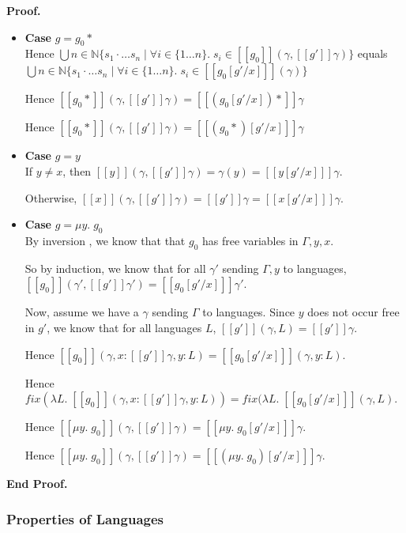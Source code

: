 \documentclass{article}
\newcommand{\fix}[2]{\mu {#1}.\;{#2}}
\newcommand{\nats}{\mathbb{N}}
\newcommand{\interp}[1]{[\![{#1}]\!]}
\newcommand{\setof}[1]{\{{#1}\}}
\newcommand{\comprehend}[2]{\setof{{#1}\;|\;{#2}}}
\newcommand{\fun}[2]{\lambda {#1}.\;{#2}}
\newenvironment{proof}{\noindent\textbf{Proof.}}{\noindent\textbf{End Proof.}}
\newenvironment{caseblock}{\begin{itemize}}{\end{itemize}}
\newenvironment{case}[1]{\item \textbf{Case} {#1}\\}{}
\begin{document}
\begin{proof}
\begin{caseblock}
\begin{case}{$g = g_0*$}
      Hence $\bigcup\limits{n \in \nats} \comprehend{s_1\cdot\ldots s_n}{\forall i \in \setof{1\ldots n}.\; s_i \in \interp{g_0}(\gamma, \interp{g'}\gamma)}$ equals\\
      $\bigcup\limits{n \in \nats} \comprehend{s_1\cdot\ldots s_n}{\forall i \in \setof{1\ldots n}.\; s_i \in \interp{g_0[g'/x]}(\gamma)}$

      Hence $\interp{g_0*}(\gamma, \interp{g'}\gamma) = \interp{(g_0[g'/x])*}\gamma$

      Hence $\interp{g_0*}(\gamma, \interp{g'}\gamma) = \interp{(g_0*)[g'/x]}\gamma$
    \end{case}

    \begin{case}{$g = y$}
      If $y \not=x$, then $\interp{y}(\gamma, \interp{g'}\gamma) = \gamma(y) = \interp{y[g'/x]}\gamma$. 

      Otherwise, $\interp{x}(\gamma, \interp{g'}\gamma) = \interp{g'}\gamma = \interp{x[g'/x]}\gamma$. 
    \end{case}

    \begin{case}{$g = \fix{y}{g_0}$}
      By inversion , we know that that $g_0$ has free variables in $\Gamma, y, x$. 

      So by induction, we know that for all $\gamma'$ sending $\Gamma, y$ to languages, 
      $\interp{g_0}(\gamma', \interp{g'}\gamma') = \interp{g_0[g'/x]}\gamma'$. 

      Now, assume we have a $\gamma$ sending $\Gamma$ to languages. Since $y$ does not 
      occur free in $g'$, we know that for all languages $L$, $\interp{g'}(\gamma, L) = \interp{g'}\gamma$. 

      Hence $\interp{g_0}(\gamma, x:\interp{g'}\gamma, y:L) = \interp{g_0[g'/x]}(\gamma, y:L)$.

      Hence $\mathit{fix}(\fun{L}{\interp{g_0}(\gamma, x:\interp{g'}\gamma, y:L)}) = \mathit{fix}(\fun{L}{\interp{g_0[g'/x]}(\gamma, L)}$. 
 
      Hence $\interp{\fix{y}{g_0}}(\gamma, \interp{g'}\gamma) = \interp{\fix{y}{g_0[g'/x]}}\gamma$. 

      Hence $\interp{\fix{y}{g_0}}(\gamma, \interp{g'}\gamma) = \interp{(\fix{y}{g_0})[g'/x]}\gamma$. 
   \end{case}
  \end{caseblock}
\end{proof}

\subsubsection{Properties of Languages}
\end{document}
